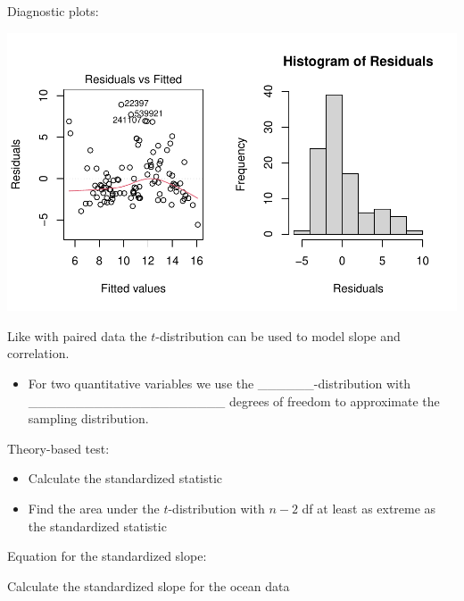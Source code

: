 \documentclass[
]{report}
\newenvironment{Shaded}{\begin{snugshade}}{\end{snugshade}}
\newcommand{\AttributeTok}[1]{\textcolor[rgb]{0.13,0.29,0.53}{#1}}
\newcommand{\CommentTok}[1]{\textcolor[rgb]{0.56,0.35,0.01}{\textit{#1}}}
\newcommand{\FunctionTok}[1]{\textcolor[rgb]{0.13,0.29,0.53}{\textbf{#1}}}
\newcommand{\NormalTok}[1]{#1}
\newcommand{\OtherTok}[1]{\textcolor[rgb]{0.56,0.35,0.01}{#1}}
\newcommand{\SpecialCharTok}[1]{\textcolor[rgb]{0.81,0.36,0.00}{\textbf{#1}}}
\providecommand{\tightlist}{%
  \setlength{\itemsep}{0pt}\setlength{\parskip}{0pt}}
\begin{document}
Diagnostic plots:

\begin{center}\includegraphics[width=0.7\linewidth]{13-LN013-regression_files/figure-latex/unnamed-chunk-11-1} \end{center}

Like with paired data the \(t\)-distribution can be used to model slope and correlation.


\begin{itemize}
\tightlist
\item
  For two quantitative variables we use the \_\_\_\_\_\_-distribution
  with \_\_\_\_\_\_\_\_\_\_\_\_\_\_\_\_\_\_\_\_\_ degrees of freedom to approximate the sampling distribution.
\end{itemize}


Theory-based test:

\begin{itemize}
\item
  Calculate the standardized statistic
\item
  Find the area under the \(t\)-distribution with \(n - 2\) df at least as extreme as the standardized statistic
\end{itemize}

Equation for the standardized slope:

\vspace{0.8in}

Calculate the standardized slope for the ocean data

\begin{Shaded}
\end{Shaded}
\end{document}
